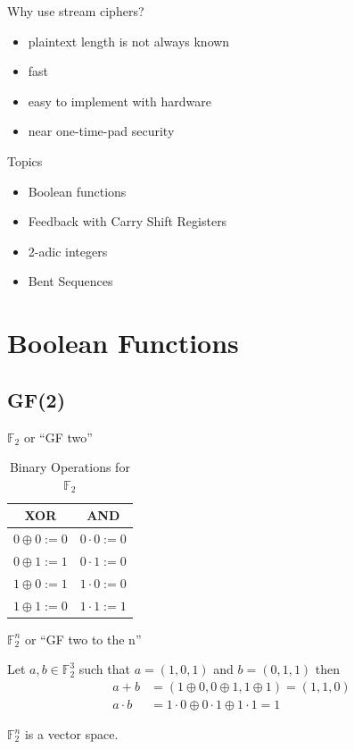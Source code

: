 \documentclass{beamer}
\def\gftwo{\mathbb{F}_2}
\begin{document}
\begin{frame}{Why use stream ciphers?}
  \begin{itemize}
      \pause
    \item plaintext length is not always known
      \pause
    \item fast
      \pause
    \item easy to implement with hardware
      \pause
    \item near one-time-pad security
  \end{itemize}
\end{frame}

\begin{frame}{Topics}
  \begin{itemize}
    \item Boolean functions
    \item Feedback with Carry Shift Registers
    \item 2-adic integers
    \item Bent Sequences
  \end{itemize}
\end{frame}

\section{Boolean Functions}
\subsection{GF(2)}
\begin{frame}{$\gftwo$ or ``GF two''}
  \begin{table}[h!]\label{tab:GF(2)}
    \centering
    \begin{tabular}{|c|c|}
      \hline
      XOR&AND\\
      \hline
      $0\oplus0:=0$&$0\cdot0:=0$\\
      $0\oplus1:=1$&$0\cdot1:=0$\\
      $1\oplus0:=1$&$1\cdot0:=0$\\
      $1\oplus1:=0$&$1\cdot1:=1$\\
      \hline
    \end{tabular}
  \caption{Binary Operations for $\gftwo$}
  \end{table}
\end{frame}

\begin{frame}{$\gftwo^n$ or ``GF two to the n''}
\begin{example}
  Let $a,b\in\gftwo^3$ such that $a=(1,0,1)$ and $b=(0,1,1)$ then
  \begin{align*}
    a+b      &=(1\oplus0,0\oplus1,1\oplus1)=(1,1,0) \\
  a\cdot b &=1\cdot0\oplus0\cdot1\oplus1\cdot1=1
  \end{align*}
\end{example}

\begin{fact}
  $\gftwo^n$ is a vector space.
\end{fact}
\end{frame}
\end{document}
